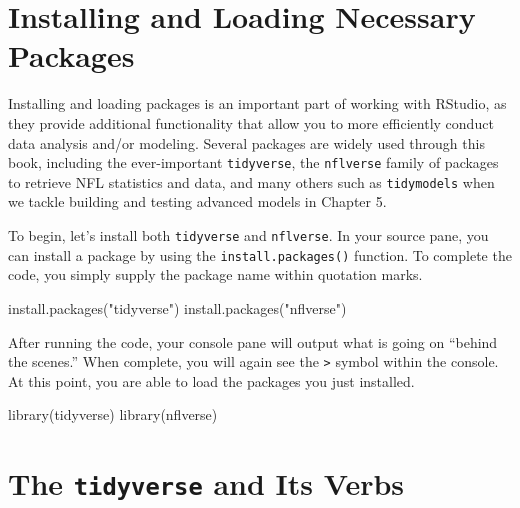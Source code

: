 \documentclass[
  letterpaper,
]{krantz}
\newenvironment{Shaded}{\begin{snugshade}}{\end{snugshade}}
\newcommand{\FunctionTok}[1]{\textcolor[rgb]{0.28,0.35,0.67}{#1}}
\newcommand{\NormalTok}[1]{\textcolor[rgb]{0.00,0.23,0.31}{#1}}
\newcommand{\StringTok}[1]{\textcolor[rgb]{0.13,0.47,0.30}{#1}}
\begin{document}
\hypertarget{installing-and-loading-necessary-packages}{%
\section{Installing and Loading Necessary
Packages}\label{installing-and-loading-necessary-packages}}

Installing and loading packages is an important part of working with
RStudio, as they provide additional functionality that allow you to more
efficiently conduct data analysis and/or modeling. Several packages are
widely used through this book, including the ever-important
\texttt{tidyverse}, the \texttt{nflverse} family of packages to retrieve
NFL statistics and data, and many others such as \texttt{tidymodels}
when we tackle building and testing advanced models in Chapter 5.

To begin, let's install both \texttt{tidyverse} and \texttt{nflverse}.
In your source pane, you can install a package by using the
\texttt{install.packages()} function. To complete the code, you simply
supply the package name within quotation marks.

\begin{Shaded}
\begin{Highlighting}[]
\FunctionTok{install.packages}\NormalTok{(}\StringTok{"tidyverse"}\NormalTok{)}
\FunctionTok{install.packages}\NormalTok{(}\StringTok{"nflverse"}\NormalTok{)}
\end{Highlighting}
\end{Shaded}

After running the code, your console pane will output what is going on
``behind the scenes.'' When complete, you will again see the
\texttt{\textgreater{}} symbol within the console. At this point, you
are able to load the packages you just installed.

\begin{Shaded}
\begin{Highlighting}[]
\FunctionTok{library}\NormalTok{(tidyverse)}
\FunctionTok{library}\NormalTok{(nflverse)}
\end{Highlighting}
\end{Shaded}

\hypertarget{the-tidyverse-and-its-verbs}{%
\section{\texorpdfstring{The \texttt{tidyverse} and Its
Verbs}{The tidyverse and Its Verbs}}\label{the-tidyverse-and-its-verbs}}
\end{document}
